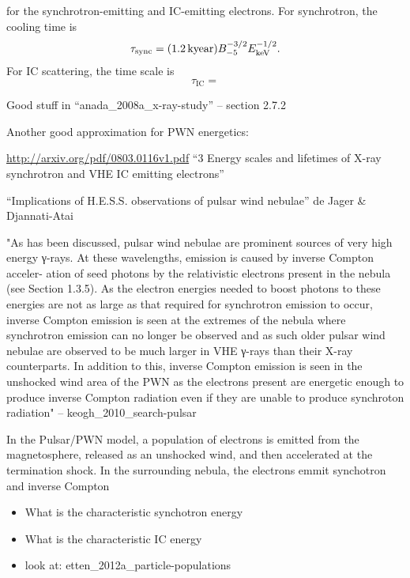 for the synchrotron-emitting and \ac{IC}-emitting electrons.
For synchrotron, the cooling time is
\begin{equation}
  \tau_\text{sync} = (1.2\,\text{k}\text{year}) B_{-5}^{-3/2} E_\text{keV}^{-1/2}.
\end{equation}
For \ac{IC} scattering, the time scale is
\begin{equation}
  \tau_\text{IC} = 
\end{equation}




Good stuff in ``anada\_2008a\_x-ray-study'' -- section 2.7.2 

Another good approximation for PWN energetics:

\url{http://arxiv.org/pdf/0803.0116v1.pdf}
``3 Energy scales and lifetimes of X-ray synchrotron and
VHE IC emitting electrons''

``Implications of H.E.S.S. observations of pulsar wind nebulae'' de
Jager \& Djannati-Atai

"As has been discussed, pulsar wind nebulae are prominent sources of
very high energy γ-rays. At these wavelengths, emission is caused
by inverse Compton acceler- ation of seed photons by the relativistic
electrons present in the nebula (see Section 1.3.5). As the electron
energies needed to boost photons to these energies are not as large as
that required for synchrotron emission to occur, inverse Compton emission
is seen at the extremes of the nebula where synchrotron emission can no
longer be observed and as such older pulsar wind nebulae are observed to
be much larger in VHE γ-rays than their X-ray counterparts. In addition
to this, inverse Compton emission is seen in the unshocked wind area of
the PWN as the electrons present are energetic enough to produce inverse
Compton radiation even if they are unable to produce synchroton radiation"
-- keogh\_2010\_search-pulsar



In the Pulsar/\ac{PWN} model, a population of electrons
is emitted from the magnetosphere, released as an unshocked wind,
and then accelerated at the termination shock. In the surrounding
nebula, the electrons emmit synchotron and inverse Compton

\begin{itemize}
  \item What is the characteristic synchotron energy
  \item What is the characteristic \ac{IC} energy
  \item look at: etten\_2012a\_particle-populations
\end{itemize}




